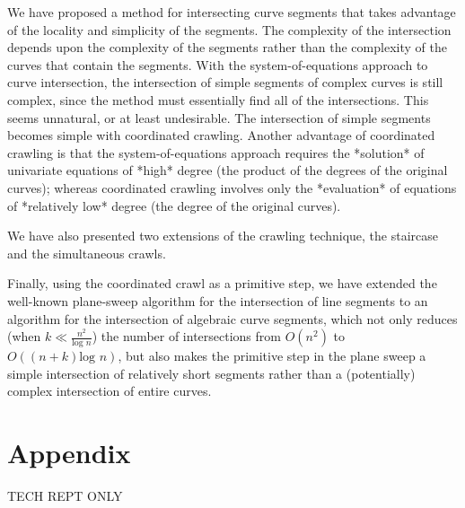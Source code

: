 We have proposed a method for intersecting curve segments that takes advantage
of the locality and simplicity of the segments.
The complexity of the intersection depends upon the complexity of the segments
rather than the complexity of the curves that contain the segments.
With the system-of-equations approach to curve intersection,
the intersection of simple segments of complex curves is still complex,
since the method must essentially find all of the intersections.
This seems unnatural, or at least undesirable.
The intersection of simple segments becomes simple with 
coordinated crawling.
%
\ifFull Another advantage of coordinated crawling is that
the system-of-equations approach requires the *solution* of univariate 
equations of *high* degree (the product of the degrees of the original curves);
whereas coordinated crawling involves only the *evaluation* of equations 
of *relatively low* degree (the degree of the original curves). \fi
%

We have also presented two extensions of the crawling technique,
the staircase and the simultaneous crawls.

Finally, using the coordinated crawl as a primitive step,
we have extended the well-known plane-sweep algorithm for the intersection
of line segments to an algorithm for the intersection of algebraic curve segments,
which not only reduces (when $k \ll \frac{n^2}{\mbox{log }n}$) 
the number of intersections from $O(n^2)$ to $O((n+k) \mbox{log }n)$, but also
makes the primitive step in the plane sweep a simple intersection of relatively
short
segments rather than a (potentially) complex intersection of entire curves.
%
\ifFull
\section{Appendix}
%
TECH REPT ONLY

